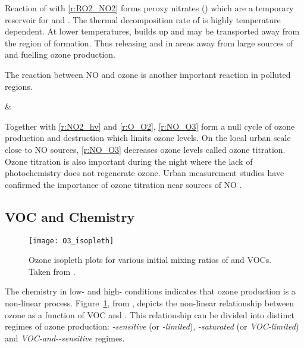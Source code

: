 Reaction of  with  \eqref{r:RO2_NO2} forms peroxy nitrates () which are a temporary reservoir for  and .
The thermal decomposition rate of  is highly temperature dependent.
At lower temperatures,  builds up and may be transported away from the region of formation. 
Thus releasing  and  in areas away from large sources of  and fuelling ozone production.

The reaction between NO and ozone is another important reaction in polluted regions.
\begin{rxnarray}
     & \rightarrow {} \label{r:NO_O3}
\end{rxnarray}
Together with \eqref{r:NO2_hv} and \eqref{r:O_O2}, \eqref{r:NO_O3} form a null cycle of ozone production and destruction which limits ozone levels.
On the local urban scale close to NO sources, \eqref{r:NO_O3} decreases ozone levels called ozone titration.
Ozone titration is also important during the night where the lack of photochemistry does not regenerate ozone.
Urban measurement studies have confirmed the importance of ozone titration near sources of NO \citep{Syri:2001}.

\subsection[VOC and NOx Chemistry]{VOC and  Chemistry} \label{ss:VOC_NOx}
\begin{figure}[t]%
	\begin{center}%
        \caption[Ozone mixing ratios as a function of  and VOCs]{Ozone isopleth plots for various initial mixing ratios of  and VOCs. Taken from \citet{Jenkin:2000}.}%
        \texttt{[image: O3\_isopleth]}%
		\label{f:O3_isopleth}%
	\end{center}%
\end{figure}%
The chemistry in low- and high- conditions indicates that ozone production is a non-linear process.
Figure~\ref{f:O3_isopleth}, from \citet{Jenkin:2000}, depicts the non-linear relationship between ozone as a function of VOC and .
This relationship can be divided into distinct regimes of ozone production: \emph{-sensitive} (or \emph{-limited}), \emph{-saturated} (or \emph{VOC-limited}) and \emph{VOC-and--sensitive} regimes. 

